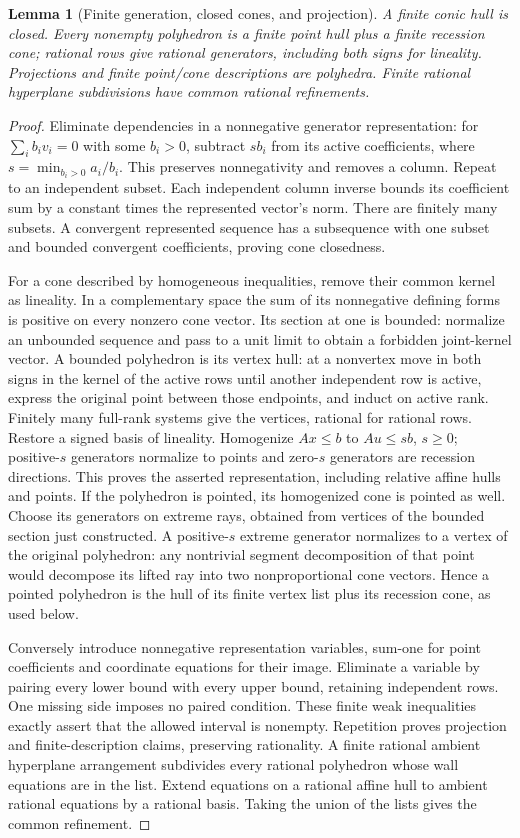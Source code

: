 \documentclass[11pt]{article}
\newtheorem{lemma}[theorem]{Lemma}
\begin{document}
\begin{lemma}[Finite generation, closed cones, and projection]\label{l:poly}
A finite conic hull is closed. Every nonempty polyhedron is a finite point hull plus a finite recession cone; rational rows give rational generators, including both signs for lineality. Projections and finite point/cone descriptions are polyhedra. Finite rational hyperplane subdivisions have common rational refinements.
\end{lemma}
\begin{proof}
Eliminate dependencies in a nonnegative generator representation: for $\sum_i b_i v_i=0$ with some $b_i>0$, subtract $s b_i$ from its active coefficients, where $s=\min_{b_i>0}a_i/b_i$. This preserves nonnegativity and removes a column. Repeat to an independent subset. Each independent column inverse bounds its coefficient sum by a constant times the represented vector's norm. There are finitely many subsets. A convergent represented sequence has a subsequence with one subset and bounded convergent coefficients, proving cone closedness.

For a cone described by homogeneous inequalities, remove their common kernel as lineality. In a complementary space the sum of its nonnegative defining forms is positive on every nonzero cone vector. Its section at one is bounded: normalize an unbounded sequence and pass to a unit limit to obtain a forbidden joint-kernel vector. A bounded polyhedron is its vertex hull: at a nonvertex move in both signs in the kernel of the active rows until another independent row is active, express the original point between those endpoints, and induct on active rank. Finitely many full-rank systems give the vertices, rational for rational rows. Restore a signed basis of lineality. Homogenize $Ax\leq b$ to $Au\leq sb$, $s\geq0$; positive-$s$ generators normalize to points and zero-$s$ generators are recession directions. This proves the asserted representation, including relative affine hulls and points. If the polyhedron is pointed, its homogenized cone is pointed as well. Choose its generators on extreme rays, obtained from vertices of the bounded section just constructed. A positive-$s$ extreme generator normalizes to a vertex of the original polyhedron: any nontrivial segment decomposition of that point would decompose its lifted ray into two nonproportional cone vectors. Hence a pointed polyhedron is the hull of its finite vertex list plus its recession cone, as used below.

Conversely introduce nonnegative representation variables, sum-one for point coefficients and coordinate equations for their image. Eliminate a variable by pairing every lower bound with every upper bound, retaining independent rows. One missing side imposes no paired condition. These finite weak inequalities exactly assert that the allowed interval is nonempty. Repetition proves projection and finite-description claims, preserving rationality. A finite rational ambient hyperplane arrangement subdivides every rational polyhedron whose wall equations are in the list. Extend equations on a rational affine hull to ambient rational equations by a rational basis. Taking the union of the lists gives the common refinement.
\end{proof}
\end{document}
